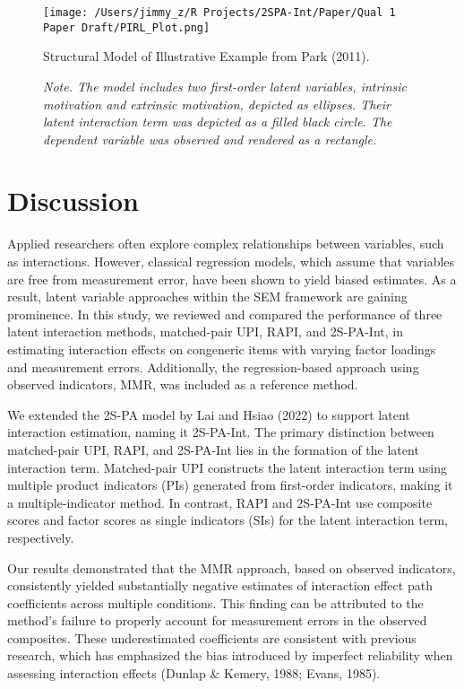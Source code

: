 \documentclass[
  man]{apa6}
\begin{document}
\begin{figure}[h]
\centering
\texttt{[image: /Users/jimmy\_z/R Projects/2SPA-Int/Paper/Qual 1 Paper Draft/PIRL\_Plot.png]}
\caption{Structural Model of Illustrative Example from Park (2011).}
\caption*{\textit{Note. The model includes two first-order latent variables, intrinsic motivation and extrinsic motivation, depicted as ellipses. Their latent interaction term was depicted as a filled black circle. The dependent variable was observed and rendered as a rectangle.}}
\end{figure}

\section{Discussion}\label{discussion}

Applied researchers often explore complex relationships between variables, such as interactions. However, classical regression models, which assume that variables are free from measurement error, have been shown to yield biased estimates. As a result, latent variable approaches within the SEM framework are gaining prominence. In this study, we reviewed and compared the performance of three latent interaction methods, matched-pair UPI, RAPI, and 2S-PA-Int, in estimating interaction effects on congeneric items with varying factor loadings and measurement errors. Additionally, the regression-based approach using observed indicators, MMR, was included as a reference method.

We extended the 2S-PA model by Lai and Hsiao (2022) to support latent interaction estimation, naming it 2S-PA-Int. The primary distinction between matched-pair UPI, RAPI, and 2S-PA-Int lies in the formation of the latent interaction term. Matched-pair UPI constructs the latent interaction term using multiple product indicators (PIs) generated from first-order indicators, making it a multiple-indicator method. In contrast, RAPI and 2S-PA-Int use composite scores and factor scores as single indicators (SIs) for the latent interaction term, respectively.

Our results demonstrated that the MMR approach, based on observed indicators, consistently yielded substantially negative estimates of interaction effect path coefficients across multiple conditions. This finding can be attributed to the method's failure to properly account for measurement errors in the observed composites. These underestimated coefficients are consistent with previous research, which has emphasized the bias introduced by imperfect reliability when assessing interaction effects (Dunlap \& Kemery, 1988; Evans, 1985).
\end{document}
